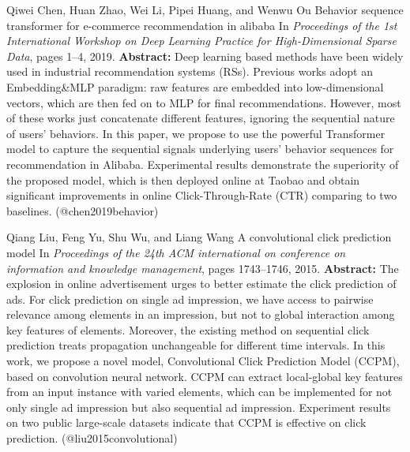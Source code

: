 \documentclass{article}
\begin{document}
\begin{thebibliography}{}
 Qiwei Chen, Huan Zhao, Wei Li, Pipei Huang, and Wenwu Ou \newblock Behavior sequence transformer for e-commerce recommendation in alibaba \newblock In {\em Proceedings of the 1st International Workshop on Deep Learning Practice for High-Dimensional Sparse Data}, pages 1--4, 2019. \newblock \textbf{Abstract:} Deep learning based methods have been widely used in industrial recommendation systems (RSs). Previous works adopt an Embedding\&MLP paradigm: raw features are embedded into low-dimensional vectors, which are then fed on to MLP for final recommendations. However, most of these works just concatenate different features, ignoring the sequential nature of users' behaviors. In this paper, we propose to use the powerful Transformer model to capture the sequential signals underlying users' behavior sequences for recommendation in Alibaba. Experimental results demonstrate the superiority of the proposed model, which is then deployed online at Taobao and obtain significant improvements in online Click-Through-Rate (CTR) comparing to two baselines. \newblock (@chen2019behavior)

 Qiang Liu, Feng Yu, Shu Wu, and Liang Wang \newblock A convolutional click prediction model \newblock In {\em Proceedings of the 24th ACM international on conference on information and knowledge management}, pages 1743--1746, 2015. \newblock \textbf{Abstract:} The explosion in online advertisement urges to better estimate the click prediction of ads. For click prediction on single ad impression, we have access to pairwise relevance among elements in an impression, but not to global interaction among key features of elements. Moreover, the existing method on sequential click prediction treats propagation unchangeable for different time intervals. In this work, we propose a novel model, Convolutional Click Prediction Model (CCPM), based on convolution neural network. CCPM can extract local-global key features from an input instance with varied elements, which can be implemented for not only single ad impression but also sequential ad impression. Experiment results on two public large-scale datasets indicate that CCPM is effective on click prediction. \newblock (@liu2015convolutional)


\end{thebibliography}
\end{document}
